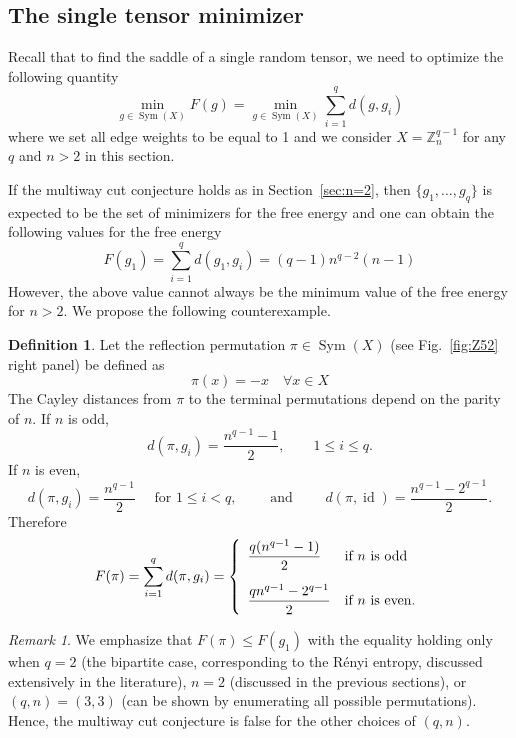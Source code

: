 \documentclass[11pt,oneside,letterpaper]{article}
\numberwithin{equation}{section}
\theoremstyle{definition}
\newtheorem{definition}[theorem]{Definition}
\theoremstyle{remark}
\newtheorem{remark}[theorem]{Remark}
\DeclareMathOperator{\id}{id}
\DeclareMathOperator{\Sym}{Sym}
\begin{document}
\subsection{The single tensor minimizer}
Recall that to find the saddle of a single random tensor, we need to optimize the following quantity
\begin{equation}
  \min_{g\in \Sym(X)} F(g) = \min_{g\in \Sym(X)} \sum_{i=1}^q d(g, g_i)
\end{equation}
where we set all edge weights to be equal to 1 and we consider $X=\mathbb{Z}_n^{q-1}$ for any $q$ and $n>2$ in this section.

If the multiway cut conjecture holds as in Section~\ref{sec:n=2}, then $\{g_1, \dots, g_q\}$ is expected to be the set of minimizers for the free energy and one can obtain the following values for the free energy
\begin{equation}
  F(g_1) =  \sum_{i=1}^qd(g_1, g_i)= (q-1)n^{q-2}(n-1)
\end{equation}
However, the above value cannot always be the minimum value of the free energy for $n>2$. We propose the following counterexample.

\begin{definition}
  Let the reflection permutation $\pi\in \Sym(X)$ (see Fig.~\ref{fig:Z52} right panel) be defined as
  \begin{equation}
    \pi(x) = -x \quad \forall x\in X
  \end{equation}
  The Cayley distances from $\pi$ to the terminal permutations depend on the parity of $n$. If $n$ is odd,
  \begin{equation}
    d(\pi,g_i)=\frac{n^{q-1}-1}{2},\qquad 1\leq i \leq q.
  \end{equation}
  If $n$ is even,
  \begin{equation}
    d(\pi,g_i)=\frac{n^{q-1}}{2}\quad \text{ for } 1\leq i< q, \qquad \text{ and }
    \qquad
    d(\pi,\id)=\frac{n^{q-1}-2^{q-1}}{2}.
  \end{equation}
  Therefore
  \begin{equation}
    F(\pi) = \sum_{i=1}^qd(\pi, g_i) = \left\{\begin{array}{ll}
      \dfrac{q(n^{q-1}-1)}{2} & \text{if $n$ is odd} \vspace{1em}\\
      \dfrac{qn^{q-1}-2^{q-1}}{2} & \text{if $n$ is even}.
    \end{array}\right.
  \end{equation}
\end{definition}
\begin{remark}
  We emphasize that $F(\pi)\leq F(g_1)$ with the equality holding only when $q=2$ (the bipartite case, corresponding to the R\'enyi entropy, discussed extensively in the literature), $n=2$ (discussed in the previous sections), or $(q, n)=(3, 3)$ (can be shown by enumerating all possible permutations). Hence, the multiway cut conjecture is false for the other choices of $(q, n)$.
\end{remark}
\end{document}
